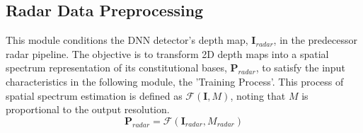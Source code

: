 




\subsection{Radar Data Preprocessing}
This module conditions the DNN detector's depth map, $\textbf{I}_{radar}$, in the predecessor radar pipeline. The objective is to transform 2D depth maps into a spatial spectrum representation of its constitutional bases, $\textbf{P}_{radar}$, to satisfy the input characteristics in the following module, the 'Training Process'. This process of spatial spectrum estimation is defined as $\mathscr{F}(\textbf{I}, M)$, noting that $M$ is proportional to the output resolution.
\begin{equation}
    \textbf{P}_{radar}=\mathscr{F}(\textbf{I}_{radar}, M_{radar})
\end{equation}


